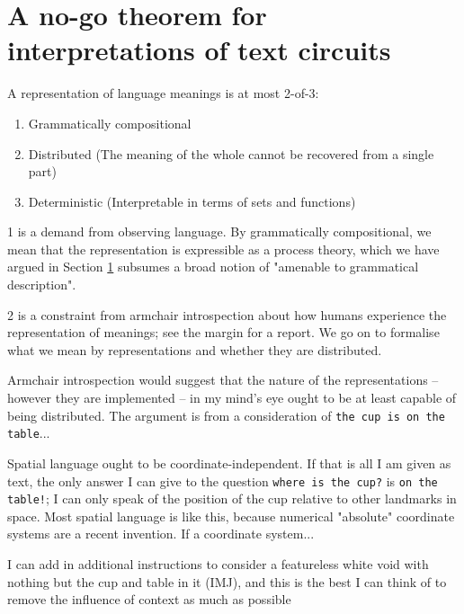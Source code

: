 \section{A no-go theorem for interpretations of text circuits}

\begin{theorem}[NO-GO]
A representation of language meanings is at most 2-of-3:\\
\begin{enumerate}
\item{Grammatically compositional}
\item{Distributed (The meaning of the whole cannot be recovered from a single part)}
\item{Deterministic (Interpretable in terms of sets and functions)}
\end{enumerate}
\end{theorem}

1 is a demand from observing language. By grammatically compositional, we mean that the representation is expressible as a process theory, which we have argued in Section \ref{} subsumes a broad notion of "amenable to grammatical description".

2 is a constraint from armchair introspection about how humans experience the representation of meanings; see the margin for a report. We go on to formalise what we mean by representations and whether they are distributed.

Armchair introspection would suggest that the nature of the representations -- however they are implemented -- in my mind's eye ought to be at least capable of being distributed. The argument is from a consideration of \texttt{the cup is on the table}...

Spatial language ought to be coordinate-independent. If that is all I am given as text, the only answer I can give to the question \texttt{where is the cup?} is \texttt{on the table!}; I can only speak of the position of the cup relative to other landmarks in space. Most spatial language is like this, because numerical "absolute" coordinate systems are a recent invention. If a coordinate system... 

I can add in additional instructions to consider a featureless white void with nothing but the cup and table in it (IMJ), and this is the best I can think of to remove the influence of context as much as possible

